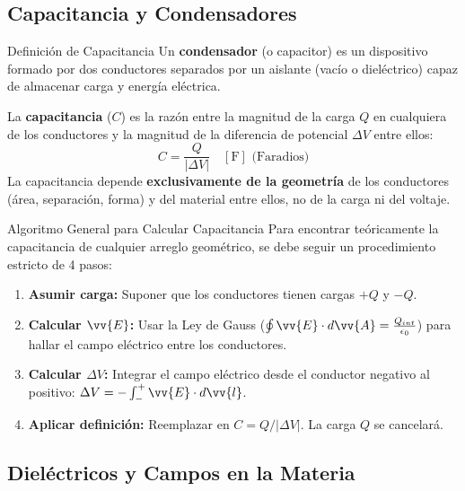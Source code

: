 \documentclass[11pt]{article}
\begin{document}
\crearEncabezado

\subsection*{Capacitancia y Condensadores}

\begin{boxTeoria}{Definición de Capacitancia}
    Un \textbf{condensador} (o capacitor) es un dispositivo formado por dos conductores separados por un aislante (vacío o dieléctrico) capaz de almacenar carga y energía eléctrica.

    La \textbf{capacitancia} ($C$) es la razón entre la magnitud de la carga $Q$ en cualquiera de los conductores y la magnitud de la diferencia de potencial $\Delta V$ entre ellos:
    \begin{equation*}
        C = \frac{Q}{|\Delta V|} \quad [\unit{\F}] \text{ (Faradios)}
    \end{equation*}
    La capacitancia depende \textbf{exclusivamente de la geometría} de los conductores (área, separación, forma) y del material entre ellos, no de la carga ni del voltaje.
\end{boxTeoria}

\begin{boxTeoria}{Algoritmo General para Calcular Capacitancia}
    Para encontrar teóricamente la capacitancia de cualquier arreglo geométrico, se debe seguir un procedimiento estricto de 4 pasos:
    \begin{enumerate}
        \item \textbf{Asumir carga:} Suponer que los conductores tienen cargas $+Q$ y $-Q$.
        \item \textbf{Calcular $\vv{E}$:} Usar la Ley de Gauss ($\oint \vv{E} \cdot d\vv{A} = \frac{Q_{int}}{\epsilon_0}$) para hallar el campo eléctrico entre los conductores.
        \item \textbf{Calcular $\Delta V$:} Integrar el campo eléctrico desde el conductor negativo al positivo: $\Delta V = -\int_{-}^{+} \vv{E} \cdot d\vv{l}$.
        \item \textbf{Aplicar definición:} Reemplazar en $C = Q/|\Delta V|$. La carga $Q$ se cancelará.
    \end{enumerate}
\end{boxTeoria}

\subsection*{Dieléctricos y Campos en la Materia}
\end{document}
